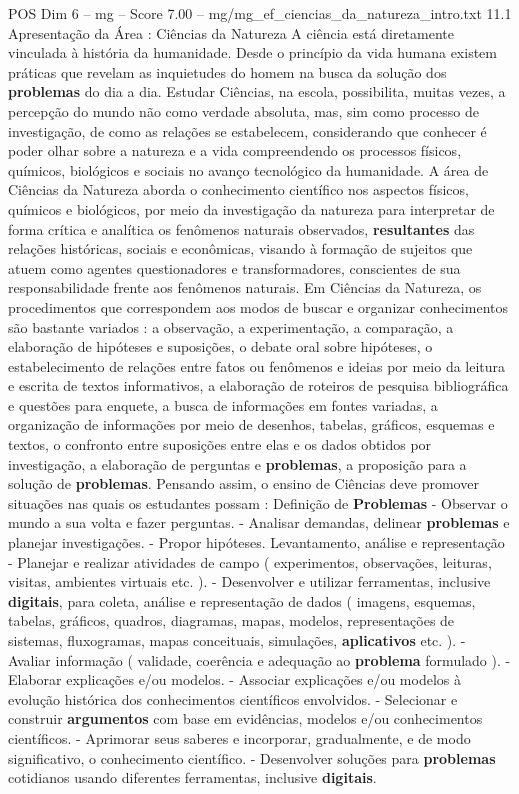 \begin{textsample}{POS Dim 6 – mg – Score 7.00 – mg/mg\_ef\_ciencias\_da\_natureza\_intro.txt}  \label{ex:f6_pos_248}
11.1 Apresentação da Área : Ciências da Natureza A ciência está diretamente vinculada à história da humanidade.
Desde o princípio da vida humana existem práticas que revelam as inquietudes do homem na busca da solução dos \textbf{problemas} do dia a dia.
Estudar Ciências, na escola, possibilita, muitas vezes, a percepção do mundo não como verdade absoluta, mas, sim como processo de investigação, de como as relações se estabelecem, considerando que conhecer é poder olhar sobre a natureza e a vida compreendendo os processos físicos, químicos, biológicos e sociais no avanço tecnológico da humanidade.
A área de Ciências da Natureza aborda o conhecimento científico nos aspectos físicos, químicos e biológicos, por meio da investigação da natureza para interpretar de forma crítica e analítica os fenômenos naturais observados, \textbf{resultantes} das relações históricas, sociais e econômicas, visando à formação de sujeitos que atuem como agentes questionadores e transformadores, conscientes de sua responsabilidade frente aos fenômenos naturais.
Em Ciências da Natureza, os procedimentos que correspondem aos modos de buscar e organizar conhecimentos são bastante variados : a observação, a experimentação, a comparação, a elaboração de hipóteses e suposições, o debate oral sobre hipóteses, o estabelecimento de relações entre fatos ou fenômenos e ideias por meio da leitura e escrita de textos informativos, a elaboração de roteiros de pesquisa bibliográfica e questões para enquete, a busca de informações em fontes variadas, a organização de informações por meio de desenhos, tabelas, gráficos, esquemas e textos, o confronto entre suposições entre elas e os dados obtidos por investigação, a elaboração de perguntas e \textbf{problemas}, a proposição para a solução de \textbf{problemas}.
Pensando assim, o ensino de Ciências deve promover situações nas quais os estudantes possam : Definição de \textbf{Problemas} - Observar o mundo a sua volta e fazer perguntas. - Analisar demandas, delinear \textbf{problemas} e planejar investigações. - Propor hipóteses.
Levantamento, análise e representação - Planejar e realizar atividades de campo ( experimentos, observações, leituras, visitas, ambientes virtuais etc. ). - Desenvolver e utilizar ferramentas, inclusive \textbf{digitais}, para coleta, análise e representação de dados ( imagens, esquemas, tabelas, gráficos, quadros, diagramas, mapas, modelos, representações de sistemas, fluxogramas, mapas conceituais, simulações, \textbf{aplicativos} etc. ). - Avaliar informação ( validade, coerência e adequação ao \textbf{problema} formulado ). - Elaborar explicações e/ou modelos. - Associar explicações e/ou modelos à evolução histórica dos conhecimentos científicos envolvidos. - Selecionar e construir \textbf{argumentos} com base em evidências, modelos e/ou conhecimentos científicos. - Aprimorar seus saberes e incorporar, gradualmente, e de modo significativo, o conhecimento científico. - Desenvolver soluções para \textbf{problemas} cotidianos usando diferentes ferramentas, inclusive \textbf{digitais}.

\end{textsample}
